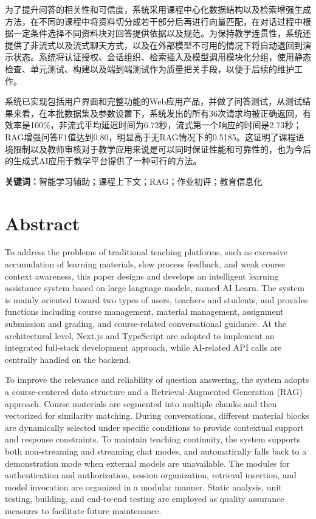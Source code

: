 \documentclass[12pt,a4paper,oneside]{ctexbook}
\numberwithin{equation}{chapter}
\begin{document}
为了提升问答的相关性和可信度，系统采用课程中心化数据结构以及检索增强生成方法，在不同的课程中将资料切分成若干部分后再进行向量匹配，在对话过程中根据一定条件选择不同资料块对回答提供依据以及规范。为保持教学连贯性，系统还提供了非流式以及流式聊天方式，以及在外部模型不可用的情况下将自动退回到演示状态。系统将认证授权、会话组织、检索插入及模型调用模块化分组，使用静态检查、单元测试、构建以及端到端测试作为质量把关手段，以便于后续的维护工作。

系统已实现包括用户界面和完整功能的Web应用产品，并做了问答测试，从测试结果来看，在本批数据集及参数设置下，系统发出的所有36次请求均被正确返回，有效率是100\%，非流式平均延迟时间为6.72秒，流式第一个响应的时间是2.73秒；RAG增强问答F1值达到0.80，明显高于无RAG情况下的0.5185。这证明了课程语境限制以及教师审核对于教学应用来说是可以同时保证性能和可靠性的，也为今后的生成式AI应用于教学平台提供了一种可行的方法。

\vspace{1em}
\noindent\textbf{关键词：}智能学习辅助；课程上下文；RAG；作业初评；教育信息化

\cleardoublepage
\chapter*{Abstract}
To address the problems of traditional teaching platforms, such as excessive accumulation of learning materials, slow process feedback, and weak course context awareness, this paper designs and develops an intelligent learning assistance system based on large language models, named AI Learn. The system is mainly oriented toward two types of users, teachers and students, and provides functions including course management, material management, assignment submission and grading, and course-related conversational guidance. At the architectural level, Next.js and TypeScript are adopted to implement an integrated full-stack development approach, while AI-related API calls are centrally handled on the backend.

To improve the relevance and reliability of question answering, the system adopts a course-centered data structure and a Retrieval-Augmented Generation (RAG) approach. Course materials are segmented into multiple chunks and then vectorized for similarity matching. During conversations, different material blocks are dynamically selected under specific conditions to provide contextual support and response constraints. To maintain teaching continuity, the system supports both non-streaming and streaming chat modes, and automatically falls back to a demonstration mode when external models are unavailable. The modules for authentication and authorization, session organization, retrieval insertion, and model invocation are organized in a modular manner. Static analysis, unit testing, building, and end-to-end testing are employed as quality assurance measures to facilitate future maintenance.
\end{document}
